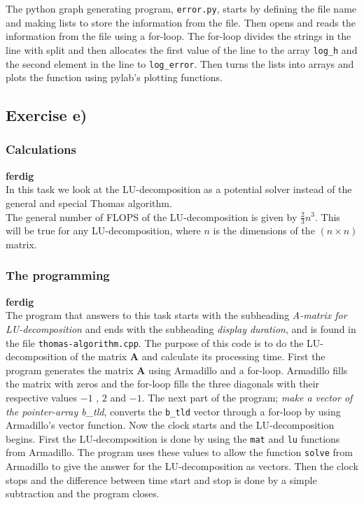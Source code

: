 \documentclass{article}
\begin{document}
    The python graph generating program, \texttt{error.py}, starts by defining the file name and making lists to store the information from the file. Then opens and reads the information from the file using a for-loop. The for-loop divides the strings in the line with split and then allocates the first value of the line to the array \texttt{log\_h} and the second element in the line to \texttt{log\_error}. Then turns the lists into arrays and plots the function using pylab's plotting functions.


\subsection{Exercise e)} \label{sec:Method e)}


  \subsubsection{Calculations}

    {\bf ferdig} \\

    In this task we look at the LU-decomposition as a potential solver instead of the general and special Thomas algorithm. \\

    The general number of FLOPS of the LU-decomposition is given by $ \frac{2}{3} n^3$. This will be true for any LU-decomposition, where $n$ is the dimensions of the $(n \times n)$ matrix.


  \subsubsection{The programming}

    {\large \bf ferdig} \\

    The program that answers to this task starts with the subheading \textit{A-matrix for LU-decomposition} and ends with the subheading \textit{display duration}, and is found in the file \texttt{thomas-algorithm.cpp}. The purpose of this code is to do the LU-decomposition of the matrix \textbf{A} and calculate its processing time. First the program generates the matrix \textbf{A} using Armadillo and a for-loop. Armadillo fills the matrix with zeros and the for-loop fills the three diagonals with their respective values $-1$ , $2$ and $ -1$. The next part of the program; \textit{make a vector of the pointer-array b\_tld}, converts the \texttt{b\_tld} vector through a for-loop by using Armadillo's vector function. Now the clock starts and the LU-decomposition begins. First the LU-decomposition is done by using the \texttt{mat} and \texttt{lu} functions from Armadillo. The program uses these values to allow the function \texttt{solve} from Armadillo to give the answer for the LU-decomposition as vectors. Then the clock stops and the difference between time start and stop is done by a simple subtraction and the program closes. \\
\end{document}
